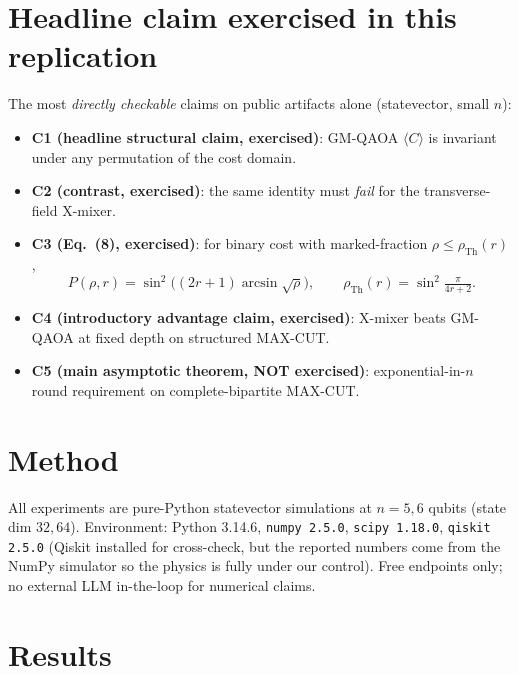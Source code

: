 \documentclass[11pt]{article}
\begin{document}
\section{Headline claim exercised in this replication}
The most \emph{directly checkable} claims on public artifacts alone (statevector, small $n$):
\begin{itemize}
  \item \textbf{C1 (headline structural claim, exercised)}: GM-QAOA $\langle C\rangle$ is invariant under any permutation of the cost domain.
  \item \textbf{C2 (contrast, exercised)}: the same identity must \emph{fail} for the transverse-field X-mixer.
  \item \textbf{C3 (Eq.~(8), exercised)}: for binary cost with marked-fraction $\rho \le \rho_{\mathrm{Th}}(r)$,
  \[
    P(\rho,r) = \sin^2\!\bigl((2r+1)\arcsin\sqrt{\rho}\bigr),\qquad \rho_{\mathrm{Th}}(r) = \sin^2\!\tfrac{\pi}{4r+2}.
  \]
  \item \textbf{C4 (introductory advantage claim, exercised)}: X-mixer beats GM-QAOA at fixed depth on structured MAX-CUT.
  \item \textbf{C5 (main asymptotic theorem, NOT exercised)}: exponential-in-$n$ round requirement on complete-bipartite MAX-CUT.
\end{itemize}

\section{Method}
All experiments are pure-Python statevector simulations at $n=5,6$ qubits (state dim $32,64$).
Environment: Python 3.14.6, \texttt{numpy 2.5.0}, \texttt{scipy 1.18.0}, \texttt{qiskit 2.5.0} (Qiskit installed for cross-check, but the reported numbers come from the NumPy simulator so the physics is fully under our control). Free endpoints only; no external LLM in-the-loop for numerical claims.

\section{Results}
\end{document}
